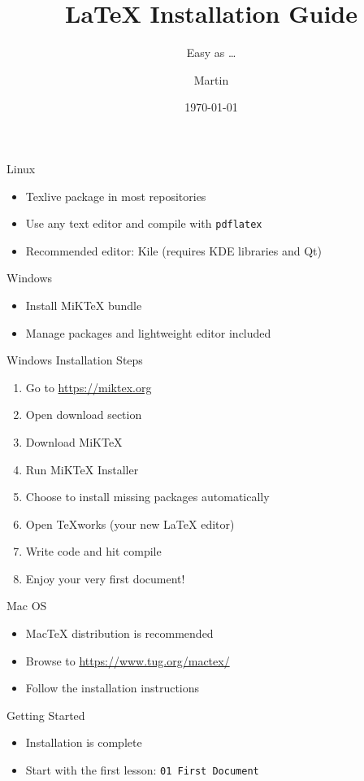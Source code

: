 \documentclass{beamer}
\title{\LaTeX{} Installation Guide}
\subtitle{Easy as \dots }
\author{Martin}
\date{\today}
\begin{document}
\begin{frame}
  \titlepage
\end{frame}

\begin{frame}
    \tableofcontents
\end{frame}

\begin{frame}{Linux}
  \begin{itemize}
    \item Texlive package in most repositories
    \item Use any text editor and compile with \texttt{pdflatex}
    \item Recommended editor: Kile (requires KDE libraries and Qt)
  \end{itemize}
\end{frame}

\begin{frame}{Windows}
  \begin{itemize}
    \item Install MiKTeX bundle
    \item Manage packages and lightweight editor included
  \end{itemize}
\end{frame}

\begin{frame}{Windows Installation Steps}
  \begin{enumerate}
    \item Go to \url{https://miktex.org}
    \item Open download section
    \item Download MiKTeX
    \item Run MiKTeX Installer
    \item Choose to install missing packages automatically
    \item Open TeXworks (your new LaTeX editor)
    \item Write code and hit compile
    \item Enjoy your very first document!
  \end{enumerate}
\end{frame}

\begin{frame}{Mac OS}
  \begin{itemize}
    \item MacTeX distribution is recommended
    \item Browse to \url{https://www.tug.org/mactex/}
    \item Follow the installation instructions
  \end{itemize}
\end{frame}

\begin{frame}{Getting Started}
  \begin{itemize}
    \item Installation is complete
    \item Start with the first lesson: \texttt{01 First Document}
  \end{itemize}
\end{frame}
\end{document}
